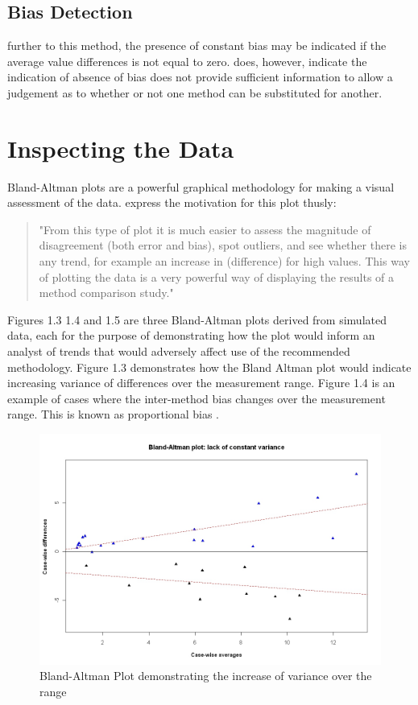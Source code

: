 \documentclass[12pt, a4paper]{report}
\theoremstyle{plain}
\theoremstyle{definition}
\theoremstyle{remark}
\begin{document}
		\subsection{Bias Detection}
		further to this method, the presence of constant bias may be
		indicated if the average value differences is not equal to zero.
		\citet{BA86} does, however, indicate the indication of absence
		of bias does not provide sufficient information to allow a
		judgement as to whether or not one method can be substituted for
		another.
		
		

	\section{Inspecting the Data}
	Bland-Altman plots are a powerful graphical methodology for making
	a visual assessment of the data. \citet*{BA83} express the
	motivation for this plot thusly:
	\begin{quote}
		"From this type of plot it is much easier to assess the magnitude
		of disagreement (both error and bias), spot outliers, and see
		whether there is any trend, for example an increase in
		(difference) for high values. This way of plotting the data is a
		very powerful way of displaying the results of a method comparison
		study."
	\end{quote}
	
	
	Figures 1.3 1.4 and 1.5 are three Bland-Altman plots derived from
	simulated data, each for the purpose of demonstrating how the plot
	would inform an analyst of trends that would adversely affect use
	of the recommended methodology. Figure 1.3 demonstrates how the
	Bland Altman plot would indicate increasing variance of
	differences over the measurement range. Figure 1.4 is an example
	of cases where the inter-method bias changes over the measurement
	range. This is known as proportional bias \citep{ludbrook97}.
	
	
	\begin{figure}[h!]
		\begin{center}
			\includegraphics[width=125mm]{images/BAFanEffect.jpeg}
			\caption{Bland-Altman Plot demonstrating the increase of variance over the range}\label{BAFanEffect}
		\end{center}
	\end{figure}
	
\end{document}
